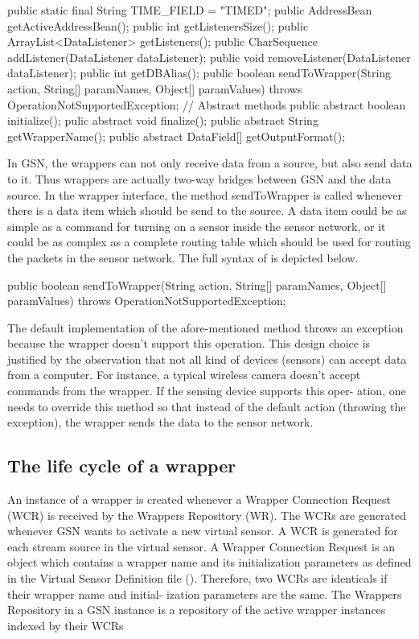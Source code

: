 \begin{javacode}
	public static final String TIME_FIELD = "TIMED";
	public AddressBean getActiveAddressBean();
	public int getListenersSize();
	public ArrayList<DataListener> getListeners();
	public CharSequence addListener(DataListener dataListener);
	public void removeListener(DataListener dataListener);
	public int getDBAlias();
	public boolean sendToWrapper(String action,
		String[] paramNames, Object[] paramValues)
			throws OperationNotSupportedException;
	// Abstract methods
	public abstract boolean initialize();
	pulic abstract void finalize();
	public abstract String getWrapperName();
	public abstract DataField[] getOutputFormat();
\end{javacode}

In GSN, the wrappers can not only receive data from a source, but also send
data to it. Thus wrappers are actually two-way bridges between GSN and the
data source. In the wrapper interface, the method sendToWrapper is called
whenever there is a data item which should be send to the source. A data
item could be as simple as a command for turning on a sensor inside the sensor
network, or it could be as complex as a complete routing table which should
be used for routing the packets in the sensor network. The full syntax of 
 is depicted below.
\begin{javacode}
	public boolean sendToWrapper(String action,
		String[] paramNames, Object[] paramValues)
		throws OperationNotSupportedException;
\end{javacode}
The default implementation of the afore-mentioned method throws an 
exception because the wrapper doesn't support this operation. This design
choice is justified by the observation that not all kind of devices (sensors) can
accept data from a computer. For instance, a typical wireless camera doesn't
accept commands from the wrapper. If the sensing device supports this oper-
ation, one needs to override this method so that instead of the default action
(throwing the exception), the wrapper sends the data to the sensor network.

\subsection{The life cycle of a wrapper}
An instance of a wrapper is created whenever a Wrapper Connection Request
(WCR) is received by the Wrappers Repository (WR). The WCRs are generated
whenever GSN wants to activate a new virtual sensor. A WCR is generated for
each stream source in the virtual sensor.
A Wrapper Connection Request is an object which contains a wrapper name
and its initialization parameters as defined in the Virtual Sensor Definition
file (\vsd). Therefore, two WCRs are identicals if their wrapper name and initial-
ization parameters are the same. The Wrappers Repository in a GSN instance
is a repository of the active wrapper instances indexed by their WCRs

